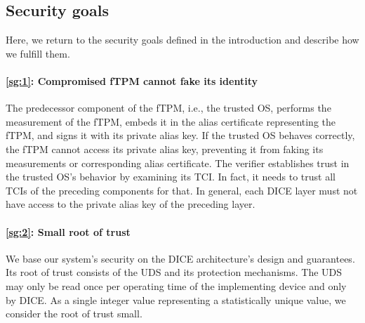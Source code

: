 


\subsection{Security goals}

Here, we return to the security goals defined in the introduction and describe how we fulfill them.

\paragraph{\ref{sg:1}: Compromised fTPM cannot fake its identity}
The predecessor component of the fTPM, i.e., the trusted OS, performs the measurement of the fTPM, embeds it in the alias certificate representing the fTPM, and signs it with its private alias key.
If the trusted OS behaves correctly, the fTPM cannot access its private alias key, preventing it from faking its measurements or corresponding alias certificate.
The verifier establishes trust in the trusted OS's behavior by examining its \ac{TCI}\@.
In fact, it needs to trust all TCIs of the preceding components for that.
In general, each DICE layer must not have access to the private alias key of the preceding layer.

\paragraph{\ref{sg:2}: Small root of trust}
We base our system's security on the DICE architecture's design and guarantees.
Its root of trust consists of the \ac{UDS} and its protection mechanisms.
The \ac{UDS} may only be read once per operating time of the implementing device and only by DICE\@.
As a single integer value representing a statistically unique value, we consider the root of trust small.

